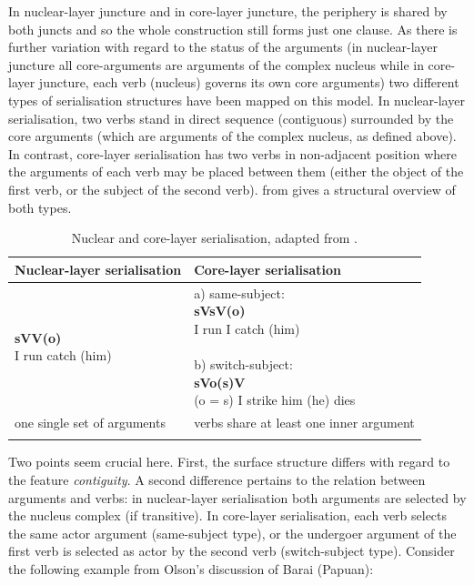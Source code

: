 In nuclear-layer juncture and in core-layer juncture, the periphery is shared by both juncts and so the whole construction still forms just one clause. As there is further variation with regard to the status of the arguments (in nuclear-layer juncture all core-arguments are arguments of the complex nucleus while in core-layer juncture, each verb (nucleus) governs its own core arguments) two different types of serialisation structures have been mapped on this model. In nuclear-layer serialisation, two verbs stand in direct sequence (contiguous) surrounded by the core arguments (which are arguments of the complex nucleus, as defined above). In contrast, core-layer serialisation has two verbs in non-adjacent position where the arguments of each verb may be placed between them (either the object of the first verb, or the subject of the second verb).  from \citet{bril2004complex} gives a structural overview of both types.

\begin{table}
\begin{tabular}{ll}
\lsptoprule 
Nuclear-layer serialisation & Core-layer serialisation \\
\midrule 
\pbox[c]{0.5\textwidth}{\textbf{sVV(o)} \\
 I run catch (him) } & 
 \pbox[c]{0.5\textwidth}{ a) same-subject: \\ \textbf{sVsV(o)} \\
 I run I catch (him) \\  \\
 b) switch-subject: \\ \textbf{sVo(s)V} \\ 
 (o = s) I strike him (he) dies }  \\
\midrule
one single set of arguments & verbs share at least one inner argument \\
\lspbottomrule
\end{tabular}
\caption[Nuclear-layer and core-layer serialisation]{Nuclear and core-layer serialisation, adapted from \citet[4]{bril2004complex}.} \label{tab:nuc-core}
\end{table}

Two points seem crucial here. First, the surface structure differs with regard to the feature \textit{contiguity}. A second difference pertains to the relation between arguments and verbs: in nuclear-layer serialisation both arguments are selected by the nucleus complex (if transitive). In core-layer serialisation, each verb selects the same actor argument (same-subject type), or the undergoer argument of the first verb is selected as actor by the second verb (switch-subject type). Consider the following example from Olson's \citep{olson1981barai} discussion of Barai (Papuan):

